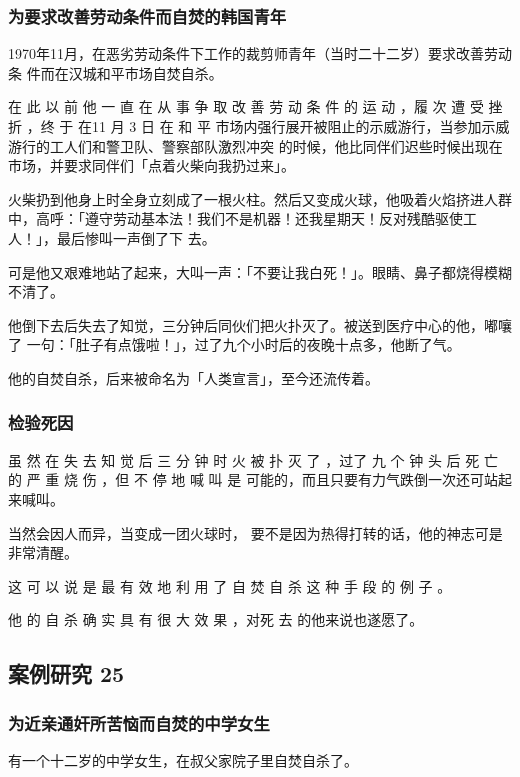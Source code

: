 \documentclass[UTF8]{ctexart}
\begin{document}
\subsubsection*{为要求改善劳动条件而自焚的韩国青年}

1970年11月，在恶劣劳动条件下工作的裁剪师青年（当时二十二岁）要求改善劳动条
件而在汉城和平市场自焚自杀。

在 此 以 前 他 一 直 在 从 事 争 取 改 善 劳 动 条 件 的 运 动 ，履 次 遭 受 挫 折 ，终 于 在11 月 3 日 在 和 平 市场内强行展开被阻止的示威游行，当参加示威游行的工人们和警卫队、警察部队激烈冲突 的时候，他比同伴们迟些时候出现在市场，并要求同伴们「点着火柴向我扔过来」。

火柴扔到他身上时全身立刻成了一根火柱。然后又变成火球，他吸着火焰挤进人群中，高呼：「遵守劳动基本法！我们不是机器！还我星期天！反对残酷驱使工人！」，最后惨叫一声倒了下 去。

可是他又艰难地站了起来，大叫一声：「不要让我白死！」。眼睛、鼻子都烧得模糊不清了。

他倒下去后失去了知觉，三分钟后同伙们把火扑灭了。被送到医疗中心的他，嘟嚷了 一句：「肚子有点饿啦！」，过了九个小时后的夜晚十点多，他断了气。

他的自焚自杀，后来被命名为「人类宣言」，至今还流传着。

\subsubsection*{检验死因}

虽 然 在 失 去 知 觉 后 三 分 钟 时 火 被 扑 灭 了 ，过了 九 个 钟 头 后 死 亡 的 严 重 烧 伤 ，但 不 停 地 喊 叫 是 可能的，而且只要有力气跌倒一次还可站起来喊叫。

当然会因人而异，当变成一团火球时， 要不是因为热得打转的话，他的神志可是非常清醒。 

这 可 以 说 是 最 有 效 地 利 用 了 自 焚 自 杀 这 种 手 段 的 例 子 。

他 的 自 杀 确 实 具 有 很 大 效 果 ，对死 去 的他来说也遂愿了。

\subsection{案例研究 25}

\subsubsection*{为近亲通奸所苦恼而自焚的中学女生}

有一个十二岁的中学女生，在叔父家院子里自焚自杀了。
\end{document}
